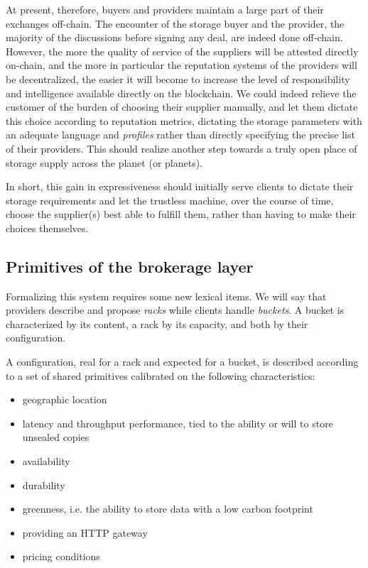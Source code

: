 \documentclass[twoside,twocolumn]{article}
\begin{document}
At present, therefore, buyers and providers maintain a large part of their exchanges off-chain.
The encounter of the storage buyer and the provider, the majority of the discussions before signing any deal, are indeed done off-chain.
However, the more the quality of service of the suppliers will be attested directly on-chain,
and the more in particular the reputation systems of the providers will be decentralized,
the easier it will become to increase the level of responsibility and intelligence available directly on the blockchain.
We could indeed relieve the customer of the burden of choosing their supplier manually,
and let them dictate this choice according to reputation metrics,
dictating the storage parameters with an adequate language and \emph{profiles} rather than directly specifying the precise list of their providers.
This should realize another step towards a truly open place of storage supply across the planet (or planets).

In short, this gain in expressiveness should initially serve clients to dictate their storage requirements
and let the trustless machine, over the course of time, choose the supplier(s) best able to fulfill them, rather than having to make their choices themselves.

\subsection{Primitives of the brokerage layer}

Formalizing this system requires some new lexical items.
We will say that providers describe and propose \emph{racks} while clients handle \emph{buckets}.
A bucket is characterized by its content, a rack by its capacity, and both by their configuration.

A configuration, real for a rack and expected for a bucket, is described according to a set of shared primitives
calibrated on the following characteristics:
\begin{itemize}
  \item geographic location
  \item latency and throughput performance, tied to the ability or will to store unsealed copies
  \item availability
  \item durability
  \item greenness, i.e. the ability to store data with a low carbon footprint
  \item providing an HTTP gateway
  \item pricing conditions
\end{itemize}
\end{document}
